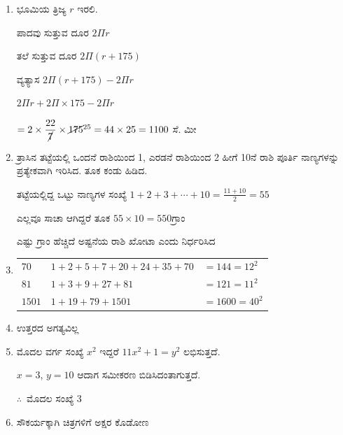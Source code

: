 \begin{enumerate}
\item ಭೂಮಿಯ ತ್ರಿಜ್ಯ $r$ ಇರಲಿ. 

\vskip 0.1cm
ಪಾದವು ಸುತ್ತುವ ದೂರ $2\Pi r$

\vskip 0.1cm
ತಲೆ ಸುತ್ತುವ ದೂರ $2\Pi (r + 175)$

\vskip 0.1cm
ವ್ಯತ್ಯಾಸ $2\Pi (r + 175) - 2\Pi r$

\vskip 0.1cm
$2\Pi r + 2\Pi\times 175 - 2\Pi r$

\vskip 0.3cm
$= 2\times \dfrac{22}{\cancel{7}} \times \cancel{175}^{25} = 44\times 25 = 1100$ ಸೆ. ಮೀ 

\item ತ್ರಾಸಿನ ತಟ್ಟೆಯಲ್ಲಿ ಒಂದನೆ ರಾಶಿಯಿಂದ 1, ಎರಡನೆ ರಾಶಿಯಿಂದ 2 ಹೀಗೆ 10ನೆ ರಾಶಿ ಪೂರ್ತಿ ನಾಣ್ಯಗಳನ್ನು ಪ್ರತ್ಯೇಕವಾಗಿ ಇರಿಸಿದ. ತೂಕ ಕಂಡು ಹಿಡಿದ. 

\vskip 0.1cm
ತಟ್ಟೆಯಲ್ಲಿದ್ದ ಒಟ್ಟು ನಾಣ್ಯಗಳ ಸಂಖ್ಯೆ $1 +2 + 3 + \cdots + 10 = \frac{11 + 10}{2} = 55$

\vskip 0.1cm
ಎಲ್ಲವೂ ಸಾಚಾ ಆಗಿದ್ದರೆ ತೂಕ $55\times 10 = 550$ಗ್ರಾಂ 

\vskip 0.1cm
ಎಷ್ಟು ಗ್ರಾಂ ಹೆಚ್ಚಿದೆ ಅಷ್ಟನೆಯ ರಾಶಿ ಖೋಟಾ ಎಂದು ನಿರ್ಧರಿಸಿದ 

\item 
{\fontsize{11pt}{13pt}\selectfont
\begin{tabular}[t]{lll}
$70$ & $1+2+5+7+20+24+35+70$  & $= 144 = 12^{2}$\\
$81$  & $1+3+9+27+81$  & $= 121 = 11^{2}$\\
$1501$  & $1 +19+79+1501$  & $= 1600 = 40^{2}$
\end{tabular}}\relax

\vskip 0.1cm

\item ಉತ್ತರದ ಅಗತ್ಯವಿಲ್ಲ 

\item ಮೊದಲ ವರ್ಗ ಸಂಖ್ಯೆ $x^{2}$ ಇದ್ದರೆ $11x^{2} + 1 = y^{2}$ ಲಭಿಸುತ್ತದೆ. 

$x = 3$, $y = 10$ ಆದಾಗ ಸಮೀಕರಣ ಬಿಡಿಸಿದಂತಾಗುತ್ತದೆ. 

$\therefore$~ಮೊದಲ ಸಂಖ್ಯೆ  3

\item  ಸೌಕರ್ಯಕ್ಕಾಗಿ ಚಿತ್ರಗಳಿಗೆ ಅಕ್ಷರ ಕೊಡೋಣ 


\end{enumerate}
